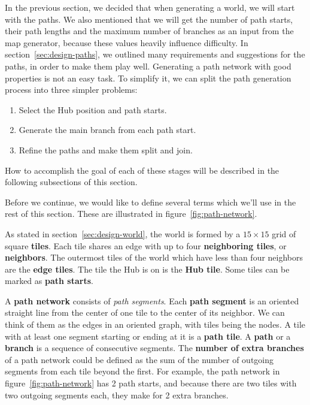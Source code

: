 In the previous section, we decided that when generating a world, we will start with the paths.
We also mentioned that we will get the number of path starts, their path lengths and the maximum number of branches as an input from the map generator, because these values heavily influence difficulty.
In section~\ref{sec:design-paths}, we outlined many requirements and suggestions for the paths, in order to make them play well.
Generating a path network with good properties is not an easy task.
To simplify it, we can split the path generation process into three simpler problems:
\begin{enumerate}
    \item Select the Hub position and path starts.
    \item Generate the main branch from each path start.
    \item Refine the paths and make them split and join.
\end{enumerate}
How to accomplish the goal of each of these stages will be described in the following subsections of this section.

Before we continue, we would like to define several terms which we'll use in the rest of this section.
These are illustrated in figure~\ref{fig:path-network}.

As stated in section~\ref{sec:design-world}, the world is formed by a $15\times15$ grid of square \textbf{tiles}.
Each tile shares an edge with up to four \textbf{neighboring tiles}, or \textbf{neighbors}.
The outermost tiles of the world which have less than four neighbors are the \textbf{edge tiles}.
The tile the Hub is on is the \textbf{Hub tile}.
Some tiles can be marked as \textbf{path starts}.

A \textbf{path network} consists of \emph{path segments}.
Each \textbf{path segment} is an oriented straight line from the center of one tile to the center of its neighbor.
We can think of them as the edges in an oriented graph, with tiles being the nodes.
A tile with at least one segment starting or ending at it is a \textbf{path tile}.
A \textbf{path} or a \textbf{branch} is a sequence of consecutive segments.
The \textbf{number of extra branches} of a path network could be defined as the sum of the number of outgoing segments from each tile beyond the first.
For example, the path network in figure~\ref{fig:path-network} has 2 path starts, and because there are two tiles with two outgoing segments each, they make for 2 extra branches.

